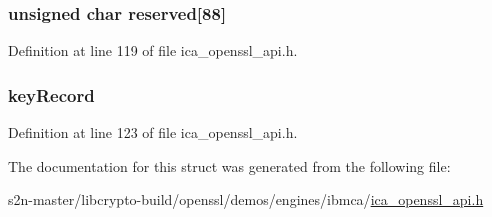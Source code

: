 \subsubsection[{\texorpdfstring{reserved}{reserved}}]{\setlength{\rightskip}{0pt plus 5cm}unsigned char reserved\mbox{[}88\mbox{]}}\hypertarget{struct___i_c_a___k_e_y___r_s_a___c_r_t_a0c6a09f3ccdc83ff1c0b9447bd861e8e}{}\label{struct___i_c_a___k_e_y___r_s_a___c_r_t_a0c6a09f3ccdc83ff1c0b9447bd861e8e}


Definition at line 119 of file ica\+\_\+openssl\+\_\+api.\+h.

\subsubsection[{\texorpdfstring{key\+Record}{keyRecord}}]{ key\+Record}\hypertarget{struct___i_c_a___k_e_y___r_s_a___c_r_t_a18b0c4a1fbf1a38eef1862ed66f3b707}{}\label{struct___i_c_a___k_e_y___r_s_a___c_r_t_a18b0c4a1fbf1a38eef1862ed66f3b707}


Definition at line 123 of file ica\+\_\+openssl\+\_\+api.\+h.



The documentation for this struct was generated from the following file\+:\begin{DoxyCompactItemize}
\item 
s2n-\/master/libcrypto-\/build/openssl/demos/engines/ibmca/\hyperlink{ica__openssl__api_8h}{ica\+\_\+openssl\+\_\+api.\+h}\end{DoxyCompactItemize}
